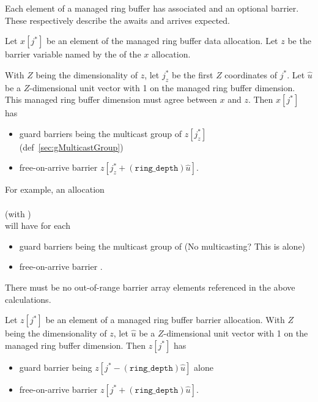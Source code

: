 
Each element of a managed ring buffer has associated  and an optional  barrier.
These respectively describe the awaits and arrives expected.

 Let $x[j^*]$ be an element of the managed ring buffer data allocation.
Let $z$ be the barrier variable named by the  of the $x$ allocation.

With $Z$ being the dimensionality of $z$, let $j_z^*$ be the first $Z$ coordinates of $j^*$.
Let $\widehat{u}$ be a $Z$-dimensional unit vector with 1 on the managed ring buffer dimension.
This managed ring buffer dimension must agree between $x$ and $z$.
Then $x[j^*]$ has
\begin{itemize}
  \item guard barriers being the multicast group of $z[j_z^*]$ (def~\ref{sec:gMulticastGroup})
  \item free-on-arrive barrier $z[j_z^* + (\texttt{ring\_depth}) \widehat{u}]$.
\end{itemize}


For example, an allocation\\
\\
(with )\\
will have for each 
\begin{itemize}
  \item guard barriers being the multicast group of  (No multicasting? This is  alone)
  \item free-on-arrive barrier .
\end{itemize}

There must be no out-of-range barrier array elements referenced in the above calculations.

 Let $z[j^*]$ be an element of a managed ring buffer barrier allocation.
With $Z$ being the dimensionality of $z$, let $\widehat{u}$ be a $Z$-dimensional unit vector with 1 on the managed ring buffer dimension.
Then $z[j^*]$ has
\begin{itemize}
  \item guard barrier being $z[j^* - (\texttt{ring\_depth}) \widehat{u}]$ alone
  \item free-on-arrive barrier $z[j^* + (\texttt{ring\_depth}) \widehat{u}]$.
\end{itemize}

